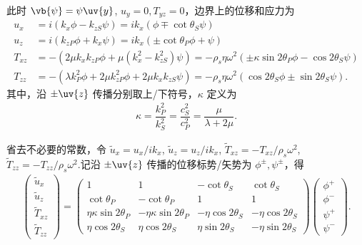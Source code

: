 此时 \(\vb{\psi} = \psi \uv{y}\), \(u_y = 0, T_{yz} = 0\)，边界上的位移和应力为
\begin{align*}
	u_x &= i \left( k_x \phi - k_{zS} \psi \right) = i k_x \left( \phi \mp \cot\theta_S \psi \right)\\
	u_z &= i \left( k_{zP} \phi + k_x \psi \right) = i k_x \left( \pm \cot\theta_P \phi + \psi \right)\\
	T_{xz} &= -\left( 2\mu k_x k_{zP} \phi + \mu (k_x^2 - k_{zS}^2) \psi \right) = -\rho_s \eta \omega^2 \left( \pm \kappa \sin2\theta_P \phi - \cos2\theta_S \psi \right)\\
	T_{zz} &= -\left( \lambda k_P^2 \phi + 2\mu k_{zP}^2 \phi + 2\mu k_x k_{zS} \psi \right) = -\rho_s \eta \omega^2 \left( \cos2\theta_S \phi \pm \sin2\theta_S \psi \right).
\end{align*}
其中，沿 \(\pm \uv{z}\) 传播分别取上/下符号，\(\kappa\) 定义为
\begin{align*}
	\kappa = \dfrac{k_P^2}{k_S^2} = \dfrac{c_S^2}{c_P^2} = \dfrac{\mu}{\lambda + 2\mu}.
\end{align*}

省去不必要的常数，令 \(\tilde{u}_x = u_x/i k_x\), \(\tilde{u}_z = u_z/i k_x\), \(\tilde{T}_{xz} = -T_{xz}/\rho_s \omega^2\), \(\tilde{T}_{zz} = -T_{zz}/\rho_s \omega^2\).记沿 \(\pm \uv{z}\) 传播的位移标势/矢势为 \(\phi^\pm, \psi^\pm\)，得
\begin{align*}
	\begin{pmatrix} \tilde{u}_x \\ \tilde{u}_z \\ \tilde{T}_{xz} \\ \tilde{T}_{zz} \end{pmatrix} =
	\begin{pmatrix}
		1                         & 1                          & -\cot\theta_S       & \cot\theta_S        \\
		\cot\theta_P              & -\cot\theta_P              & 1                   & 1                   \\
		\eta \kappa \sin2\theta_P & -\eta \kappa \sin2\theta_P & -\eta \cos2\theta_S & -\eta \cos2\theta_S \\
		\eta \cos2\theta_S        & \eta \cos2\theta_S         & \eta \sin2\theta_S  & -\eta \sin2\theta_S
	\end{pmatrix}
	\begin{pmatrix} \phi^+ \\ \phi^- \\ \psi^+ \\ \psi^- \end{pmatrix}.
\end{align*}

